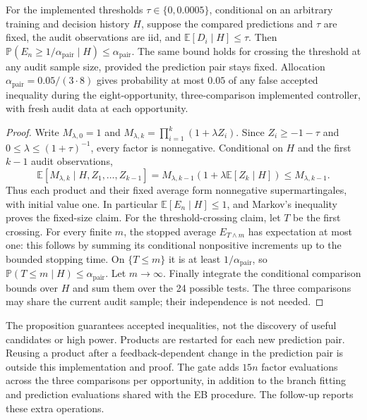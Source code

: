 \begin{proposition}
\label{prop:betting-gate}
For the implemented thresholds $\tau\in\{0,0.0005\}$,
conditional on an arbitrary training and decision history $H$, suppose
the compared predictions and $\tau$ are fixed, the audit observations
are iid, and $\mathbb E[D_i\mid H]\le\tau$. Then
$\mathbb P(E_n\ge1/\alpha_\mathrm{pair}\mid H)
\le\alpha_\mathrm{pair}$. The same bound holds for crossing the threshold
at any audit sample size, provided the prediction pair stays fixed.
Allocation $\alpha_\mathrm{pair}=0.05/(3\cdot8)$ gives probability at
most $0.05$ of any false accepted inequality during the eight-opportunity,
three-comparison implemented controller, with fresh audit data at each
opportunity.
\end{proposition}
\begin{proof}
Write $M_{\lambda,0}=1$ and
$M_{\lambda,k}=\prod_{i=1}^k(1+\lambda Z_i)$.
Since $Z_i\ge-1-\tau$ and
$0\le\lambda\le(1+\tau)^{-1}$, every factor is nonnegative.
Conditional on $H$ and the first $k-1$ audit observations,
\[
 \mathbb E[M_{\lambda,k}\mid H,Z_1,\ldots,Z_{k-1}]
 =M_{\lambda,k-1}(1+\lambda\mathbb E[Z_k\mid H])
 \le M_{\lambda,k-1}.
\]
Thus each product and their fixed average form nonnegative
supermartingales, with initial value one. In particular
$\mathbb E[E_n\mid H]\le1$, and Markov's inequality proves the
fixed-size claim. For the threshold-crossing claim, let $T$ be the first
crossing. For every finite $m$, the stopped average $E_{T\wedge m}$ has
expectation at most one: this follows by summing its conditional
nonpositive increments up to the bounded stopping time. On $\{T\le m\}$
it is at least $1/\alpha_\mathrm{pair}$, so
$\mathbb P(T\le m\mid H)\le\alpha_\mathrm{pair}$.
Let $m\to\infty$. Finally integrate the conditional comparison bounds
over $H$ and sum them over the 24 possible tests. The three comparisons
may share the current audit sample; their independence is not needed.
\end{proof}

The proposition guarantees accepted inequalities, not the discovery of
useful candidates or high power. Products are restarted for each new
prediction pair. Reusing a product after a feedback-dependent change in
the prediction pair is outside this implementation and proof. The gate
adds $15n$ factor evaluations across the three comparisons per opportunity,
in addition to the branch fitting and prediction evaluations shared with
the EB procedure. The follow-up reports these extra operations.
